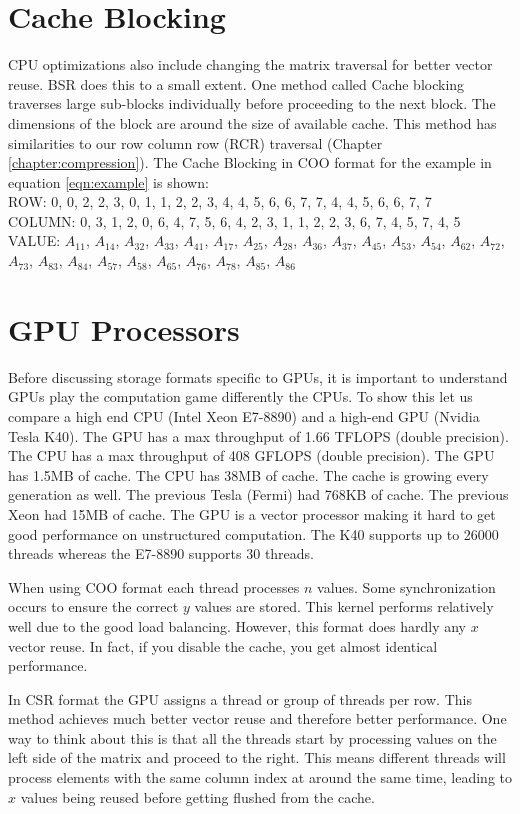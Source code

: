\section{Cache Blocking}
\par CPU optimizations also include changing the matrix traversal for better vector reuse. BSR does this to a small extent. One method called Cache blocking traverses large sub-blocks individually before proceeding to the next block. The dimensions of the block are around the size of available cache. This method has similarities to our row column row (RCR) traversal (Chapter \ref{chapter:compression}). The Cache Blocking in COO format for the example in equation \ref{eqn:example} is shown:\\
ROW: 0, 0, 2, 2, 3, 0, 1, 1, 2, 2, 3, 4, 4, 5, 6, 6, 7, 7, 4, 4, 5, 6, 6, 7, 7\\
COLUMN: 0, 3, 1, 2, 0, 6, 4, 7, 5, 6, 4, 2, 3, 1, 1, 2, 2, 3, 6, 7, 4, 5, 7, 4, 5\\
VALUE: $A_{11}$, $A_{14}$, $A_{32}$, $A_{33}$, $A_{41}$,
$A_{17}$, $A_{25}$, $A_{28}$, $A_{36}$, $A_{37}$, $A_{45}$,
$A_{53}$,  $A_{54}$, $A_{62}$, $A_{72}$, $A_{73}$, $A_{83}$, $A_{84}$,
$A_{57}$, $A_{58}$, $A_{65}$, $A_{76}$, $A_{78}$, $A_{85}$, $A_{86}$\par
\section{GPU Processors}
Before discussing storage formats specific to GPUs, it is important to understand GPUs play the computation game differently the CPUs. To show this let us compare a high end CPU (Intel Xeon E7-8890) and a high-end GPU (Nvidia Tesla K40). The GPU has a max throughput of 1.66 TFLOPS (double precision). The CPU has a max throughput of 408 GFLOPS (double precision). The GPU has 1.5MB of cache. The CPU has 38MB of cache. The cache is growing every generation as well. The previous Tesla (Fermi) had 768KB of cache. The previous Xeon had 15MB of cache. The GPU is a vector processor making it hard to get good performance on unstructured computation. The K40 supports up to 26000 threads whereas the E7-8890 supports 30 threads. \par
    When using COO format each thread processes $n$ values. Some synchronization occurs to ensure the correct $y$ values are stored. This kernel performs relatively well due to the good load balancing. However, this format does hardly any $x$ vector reuse. In fact, if you disable the cache, you get almost identical performance.\par
    In CSR format the GPU assigns a thread or group of threads per row. This method achieves much better vector reuse and therefore better performance. One way to think about this is that all the threads start by processing values on the left side of the matrix and proceed to the right. This means different threads will process elements with the same column index at around the same time, leading to $x$ values being reused before getting flushed from the cache.

